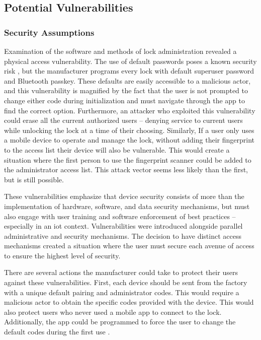 \documentclass[conference]{IEEEtran}
\begin{document}
\subsection{Potential Vulnerabilities}
\subsubsection{Security Assumptions}

Examination of the software and methods of lock administration revealed a physical access vulnerability. The use of default passwords poses a known security risk \cite{Fraunholz2017}\cite{Niemietz2015}, but the manufacturer programs every lock with default superuser password and Bluetooth passkey.  These defaults are easily accessible to a malicious actor, and this vulnerability is magnified by the fact that the user is not prompted to change either code during initialization and must navigate through the app to find the correct option.  Furthermore, an attacker who exploited this vulnerability could erase all the current authorized users -- denying service to current users while unlocking the lock at a time of their choosing. Similarly, If a user only uses a mobile device to operate and manage the lock, without adding their fingerprint to the access list their device will also be vulnerable. This would create a situation where the first person to use the fingerprint scanner could be added to the administrator access list. This attack vector seems less likely than the first, but is still possible.

\bigskip

These vulnerabilities emphasize that device security consists of more than the implementation of hardware, software, and data security mechanisms, but must also engage with user training and software enforcement of best practices -- especially in an \gls{iot} context. Vulnerabilities were introduced alongside parallel administrative and security mechanisms. The decision to have distinct access mechanisms created a situation where the user must secure each avenue of access to ensure the highest level of security.

\bigskip

There are several actions the manufacturer could take to protect their users against these vulnerabilities. First, each device should be sent from the factory with a unique default pairing and administrator codes. This would require a malicious actor to obtain the specific codes provided with the device. This would also protect users who never used a mobile app to connect to the lock. Additionally, the app could be programmed to force the user to change the default codes during the first use  \cite{Fraunholz2017}\cite{Niemietz2015}.
\end{document}
